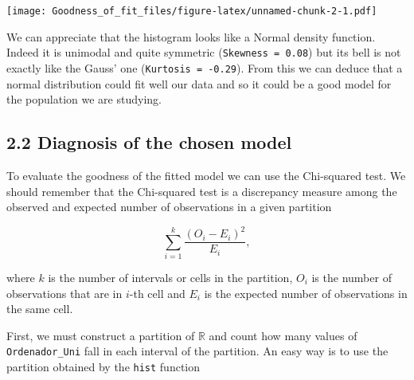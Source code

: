 \documentclass[
]{article}
\newenvironment{Shaded}{\begin{snugshade}}{\end{snugshade}}
\newcommand{\AttributeTok}[1]{\textcolor[rgb]{0.13,0.29,0.53}{#1}}
\newcommand{\CommentTok}[1]{\textcolor[rgb]{0.56,0.35,0.01}{\textit{#1}}}
\newcommand{\ConstantTok}[1]{\textcolor[rgb]{0.56,0.35,0.01}{#1}}
\newcommand{\DecValTok}[1]{\textcolor[rgb]{0.00,0.00,0.81}{#1}}
\newcommand{\FunctionTok}[1]{\textcolor[rgb]{0.13,0.29,0.53}{\textbf{#1}}}
\newcommand{\NormalTok}[1]{#1}
\newcommand{\SpecialCharTok}[1]{\textcolor[rgb]{0.81,0.36,0.00}{\textbf{#1}}}
\newcommand{\StringTok}[1]{\textcolor[rgb]{0.31,0.60,0.02}{#1}}
\begin{document}
\begin{Shaded}
\end{Shaded}

\texttt{[image: Goodness\_of\_fit\_files/figure-latex/unnamed-chunk-2-1.pdf]}

We can appreciate that the histogram looks like a Normal density
function. Indeed it is unimodal and quite symmetric
(\texttt{Skewness\ =\ 0.08}) but its bell is not exactly like the Gauss'
one (\texttt{Kurtosis\ =\ -0.29}). From this we can deduce that a normal
distribution could fit well our data and so it could be a good model for
the population we are studying.

\hypertarget{diagnosis-of-the-chosen-model}{%
\subsection{2.2 Diagnosis of the chosen
model}\label{diagnosis-of-the-chosen-model}}

To evaluate the goodness of the fitted model we can use the Chi-squared
test. We should remember that the Chi-squared test is a discrepancy
measure among the observed and expected number of observations in a
given partition

\[\sum_{i=1}^{k} \frac{(O_i-E_i)^2}{E_i},\]

where \(k\) is the number of intervals or cells in the partition,
\(O_i\) is the number of observations that are in \(i\)-th cell and
\(E_i\) is the expected number of observations in the same cell.

First, we must construct a partition of \(\mathbb{R}\) and count how
many values of \texttt{Ordenador\_Uni} fall in each interval of the
partition. An easy way is to use the partition obtained by the
\texttt{hist} function
\end{document}

